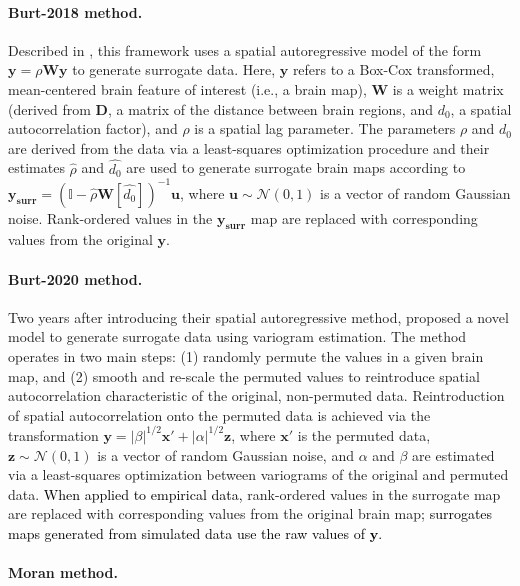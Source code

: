 \documentclass[12pt,aps,pra,reprint,showkeys]{revtex4-1}
\newcommand{\nimg}[1]{\textcolor{black}{{#1}}}
\begin{document}
\paragraph*{Burt-2018 method.}

Described in \citet{burt2018natneuro}, this framework uses a spatial autoregressive model of the form $\mathbf{y} = \rho \mathbf{W} \mathbf{y}$ to generate surrogate data.
Here, $\mathbf{y}$ refers to a Box-Cox transformed, mean-centered brain feature of interest (i.e., a brain map), $\mathbf{W}$ is a weight matrix (derived from $\mathbf{D}$, a matrix of the distance between brain regions, and $d_{0}$, a spatial autocorrelation factor), and $\rho$ is a spatial lag parameter.
The parameters $\rho$ and $d_{0}$ are derived from the data via a least-squares optimization procedure and their estimates $\hat{\rho}$ and $\hat{d_{0}}$ are used to generate surrogate brain maps according to $\mathbf{y_{surr}} = (\mathbb{I} - \hat{\rho} \mathbf{W}[\hat{d_{0}}])^{-1} \mathbf{u}$, where $\mathbf{u} \sim \mathcal{N}(0,1)$ is a vector of random Gaussian noise.
Rank-ordered values in the $\mathbf{y_{surr}}$ map are replaced with corresponding values from the original $\mathbf{y}$.

\paragraph*{Burt-2020 method.}

Two years after introducing their spatial autoregressive method, \citet{burt2020neuroimage} proposed a novel model to generate surrogate data using variogram estimation.
The method operates in two main steps: (1) randomly permute the values in a given brain map, and (2) smooth and re-scale the permuted values to reintroduce spatial autocorrelation characteristic of the original, non-permuted data.
Reintroduction of spatial autocorrelation onto the permuted data is achieved via the transformation $\mathbf{y} = |\beta|^{1/2} \mathbf{x'} + |\alpha|^{1/2} \mathbf{z}$, where $\mathbf{x'}$ is the permuted data, $\mathbf{z} \sim \mathcal{N}(0,1)$ is a vector of random Gaussian noise, and $\alpha$ and $\beta$ are estimated via a least-squares optimization between variograms of the original and permuted data.
\nimg{When applied to empirical data,} rank-ordered values in the surrogate map are replaced with corresponding values from the original brain map\nimg{; surrogates maps generated from simulated data use the raw values of $\mathbf{y}$.}

\paragraph*{Moran method.}
\end{document}
